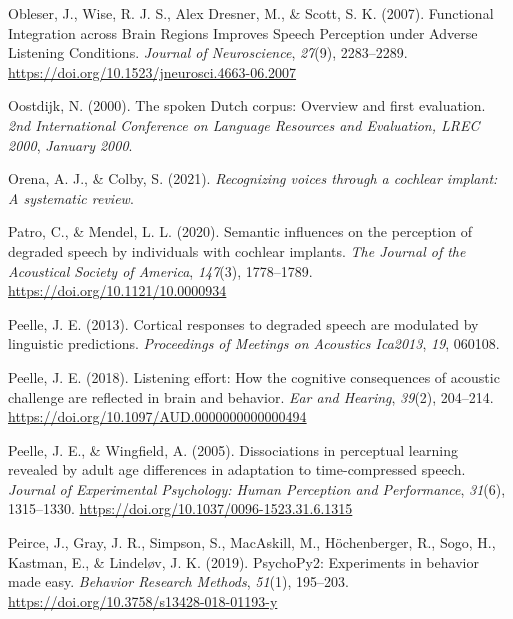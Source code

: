 \documentclass[a4paper, nobind]{templates/ociamthesis}
\newlength{\cslhangindent}
\newenvironment{CSLReferences}[2] %
 {%
  \setlength{\parindent}{0pt}
  \ifodd #1
  \let\oldpar\par
  \def\par{\hangindent=\cslhangindent\oldpar}
  \fi
  \setlength{\parskip}{1mm}
  \setlength{\baselineskip}{6mm}
 }%
 {}
\begin{document}
\begin{CSLReferences}{1}{0}
\leavevmode{}%
Obleser, J., Wise, R. J. S., Alex Dresner, M., \& Scott, S. K. (2007). Functional Integration across Brain Regions Improves Speech Perception under Adverse Listening Conditions. \emph{Journal of Neuroscience}, \emph{27}(9), 2283--2289. \url{https://doi.org/10.1523/jneurosci.4663-06.2007}

\leavevmode{}%
Oostdijk, N. (2000). {The spoken Dutch corpus: Overview and first evaluation}. \emph{2nd International Conference on Language Resources and Evaluation, LREC 2000}, \emph{January 2000}.

\leavevmode{}%
Orena, A. J., \& Colby, S. (2021). \emph{Recognizing voices through a cochlear implant: A systematic review}.

\leavevmode{}%
Patro, C., \& Mendel, L. L. (2020). Semantic influences on the perception of degraded speech by individuals with cochlear implants. \emph{The Journal of the Acoustical Society of America}, \emph{147}(3), 1778--1789. \url{https://doi.org/10.1121/10.0000934}

\leavevmode{}%
Peelle, J. E. (2013). Cortical responses to degraded speech are modulated by linguistic predictions. \emph{Proceedings of Meetings on Acoustics Ica2013}, \emph{19}, 060108.

\leavevmode{}%
Peelle, J. E. (2018). {Listening effort: How the cognitive consequences of acoustic challenge are reflected in brain and behavior}. \emph{Ear and Hearing}, \emph{39}(2), 204--214. \url{https://doi.org/10.1097/AUD.0000000000000494}

\leavevmode{}%
Peelle, J. E., \& Wingfield, A. (2005). {Dissociations in perceptual learning revealed by adult age differences in adaptation to time-compressed speech}. \emph{Journal of Experimental Psychology: Human Perception and Performance}, \emph{31}(6), 1315--1330. \url{https://doi.org/10.1037/0096-1523.31.6.1315}

\leavevmode{}%
Peirce, J., Gray, J. R., Simpson, S., MacAskill, M., Höchenberger, R., Sogo, H., Kastman, E., \& Lindeløv, J. K. (2019). {PsychoPy2: Experiments in behavior made easy}. \emph{Behavior Research Methods}, \emph{51}(1), 195--203. \url{https://doi.org/10.3758/s13428-018-01193-y}


\end{CSLReferences}
\end{document}
